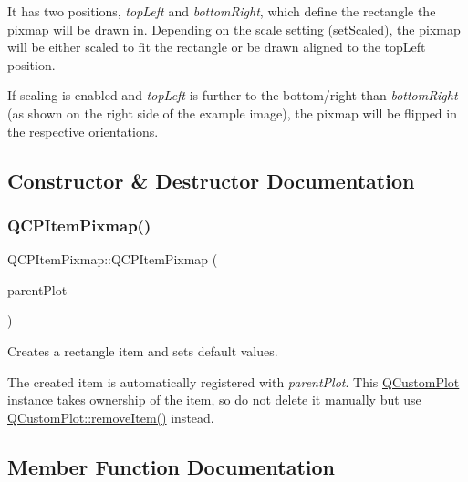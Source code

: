  It has two positions, {\itshape top\+Left} and {\itshape bottom\+Right}, which define the rectangle the pixmap will be drawn in. Depending on the scale setting (\hyperlink{classQCPItemPixmap_ab4d44529a1c6c8d37d0ea7560e042777}{set\+Scaled}), the pixmap will be either scaled to fit the rectangle or be drawn aligned to the top\+Left position.

If scaling is enabled and {\itshape top\+Left} is further to the bottom/right than {\itshape bottom\+Right} (as shown on the right side of the example image), the pixmap will be flipped in the respective orientations. 

\subsection{Constructor \& Destructor Documentation}
\mbox{\label{classQCPItemPixmap_aa6de42a37261b21a5480e7da122345c3}} 
\subsubsection{\texorpdfstring{Q\+C\+P\+Item\+Pixmap()}{QCPItemPixmap()}}
{\footnotesize\ttfamily Q\+C\+P\+Item\+Pixmap\+::\+Q\+C\+P\+Item\+Pixmap (\begin{DoxyParamCaption}\item[{\hyperlink{classQCustomPlot}{Q\+Custom\+Plot} $\ast$}]{parent\+Plot }\end{DoxyParamCaption})\hspace{0.3cm}{\ttfamily [explicit]}}

Creates a rectangle item and sets default values.

The created item is automatically registered with {\itshape parent\+Plot}. This \hyperlink{classQCustomPlot}{Q\+Custom\+Plot} instance takes ownership of the item, so do not delete it manually but use \hyperlink{classQCustomPlot_ae04446557292551e8fb6e2c106e1848d}{Q\+Custom\+Plot\+::remove\+Item()} instead. 

\subsection{Member Function Documentation}
\mbox{\label{classQCPItemPixmap_a65d1ede7bb479b90d40186d083071947}} 
